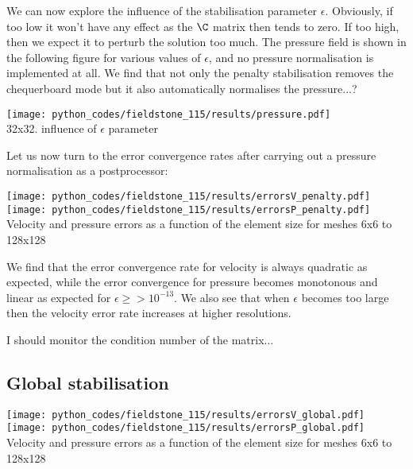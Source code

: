 We can now explore the influence of the stabilisation parameter $\epsilon$. Obviously, 
if too low it won't have any effect as the $\C$ matrix then tends to zero. If too high,
then we expect it to perturb the solution too much. 
The pressure field is shown in the following figure for various values of $\epsilon$, 
and no pressure normalisation is implemented at all. We find that not only the 
penalty stabilisation removes the chequerboard mode but it also automatically 
normalises the pressure...?  

\begin{center}
\texttt{[image: python\_codes/fieldstone\_115/results/pressure.pdf]}\\
{\captionfont 32x32. influence of $\epsilon$ parameter} 
\end{center}

Let us now turn to the error convergence rates after carrying out a pressure normalisation 
as a postprocessor:
\begin{center}
\texttt{[image: python\_codes/fieldstone\_115/results/errorsV\_penalty.pdf]}
\texttt{[image: python\_codes/fieldstone\_115/results/errorsP\_penalty.pdf]}\\
{\captionfont Velocity and pressure errors as a function of the element size for meshes 6x6 to 128x128}
\end{center}
We find that the error convergence rate for velocity is always quadratic as expected, 
while the error convergence for pressure becomes monotonous and linear as expected for $\epsilon\ge >10^{-13}$.
We also see that when $\epsilon$ becomes too large then the velocity error rate increases at higher resolutions.


I should monitor the condition number of the matrix...




\subsection*{Global stabilisation}

\begin{center}
\texttt{[image: python\_codes/fieldstone\_115/results/errorsV\_global.pdf]}
\texttt{[image: python\_codes/fieldstone\_115/results/errorsP\_global.pdf]}\\
{\captionfont Velocity and pressure errors as a function of the element size for meshes 6x6 to 128x128}
\end{center}



